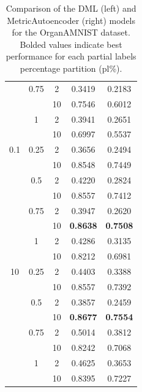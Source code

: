 \documentclass[./dissertation.tex]{subfiles}
\begin{document}
\begin{table}[]
\begin{tabular}{|c|c|c|c|c|}
             & 0.75 & 2 & 0.3419 & 0.2183 \\
             &  & 10 & 0.7546 & 0.6012 \\
             & 1 & 2 & 0.3941 & 0.2651 \\
             &  & 10 & 0.6997 & 0.5537 \\
            0.1 & 0.25 & 2 & 0.3656 & 0.2494 \\
             &  & 10 & 0.8548 & 0.7449 \\
             & 0.5 & 2 & 0.4220 & 0.2824 \\
             &  & 10 & 0.8557 & 0.7412 \\
             & 0.75 & 2 & 0.3947 & 0.2620 \\
             &  & 10 & \textbf{0.8638} & \textbf{0.7508} \\
             & 1 & 2 & 0.4286 & 0.3135 \\
             &  & 10 & 0.8212 & 0.6981 \\
            10 & 0.25 & 2 & 0.4403 & 0.3388 \\
             &  & 10 & 0.8557 & 0.7392 \\
             & 0.5 & 2 & 0.3857 & 0.2459 \\
             &  & 10 & \textbf{0.8677} & \textbf{0.7554} \\
             & 0.75 & 2 & 0.5014 & 0.3812 \\
             &  & 10 & 0.8242 & 0.7068 \\
             & 1 & 2 & 0.4625 & 0.3653 \\
             &  & 10 & 0.8395 & 0.7227 \\
            \hline
       \end{tabular}
       \caption{Comparison of the DML (left) and MetricAutoencoder (right) models for the OrganAMNIST dataset. Bolded values indicate best performance for each partial labels percentage partition (pl\%).\\}
       \label{tab:my_label}
   \end{table}
   
   
\end{document}
